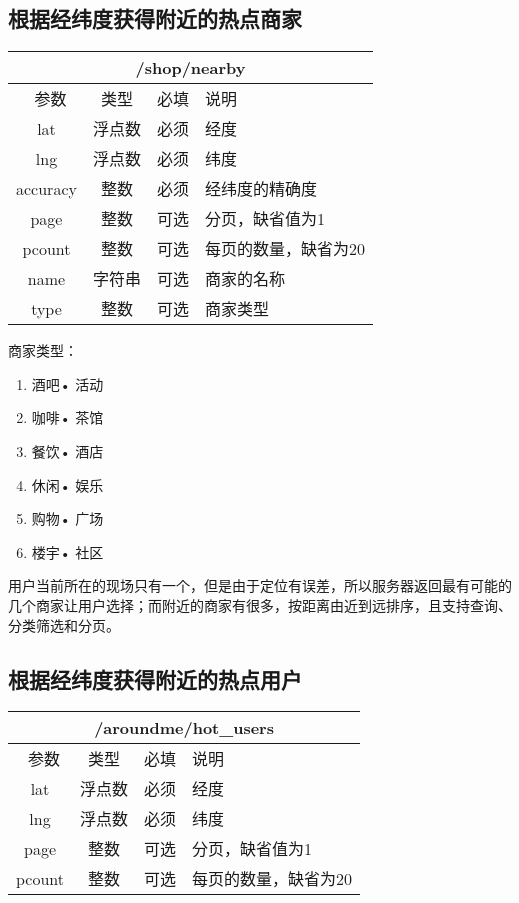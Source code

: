 \documentclass[cs4size]{ctexartutf8}
\begin{document}
\subsection{根据经纬度获得附近的热点商家}

\begin{table}[H]
   \begin{center}
\begin{tabular}{|c|c|c|p{12cm}|}
\hline
\multicolumn{4}{|c|}{/shop/nearby} \\
\hline\hline
 \  参数  & 类型 & 必填 &  说明  \\
\hline
 lat  & 浮点数 & 必须 & 经度\\
\hline
 lng  &  浮点数 & 必须 & 纬度\\ 
\hline
 accuracy  & 整数 & 必须 & 经纬度的精确度\\ 
 \hline
 page  & 整数 & 可选 & 分页，缺省值为1\\ 
 \hline
 pcount  & 整数 & 可选 & 每页的数量，缺省为20\\ 
  \hline
 name  & 字符串 & 可选 & 商家的名称\\ 
  \hline
 type  & 整数 & 可选 & 商家类型\\  
\hline
\end{tabular}
   \end{center}
\end{table}

商家类型：
\begin{enumerate}
\item 酒吧• 活动
\item 咖啡• 茶馆   
\item 餐饮• 酒店
\item 休闲• 娱乐
\item 购物• 广场
\item 楼宇• 社区
\end{enumerate}


用户当前所在的现场只有一个，但是由于定位有误差，所以服务器返回最有可能的几个商家让用户选择；而附近的商家有很多，按距离由近到远排序，且支持查询、分类筛选和分页。


\subsection{根据经纬度获得附近的热点用户}

\begin{table}[H]
   \begin{center}
\begin{tabular}{|c|c|c|p{12cm}|}
\hline
\multicolumn{4}{|c|}{/aroundme/hot\_users} \\
\hline\hline
 \  参数  & 类型 & 必填 &  说明  \\
\hline
 lat  & 浮点数 & 必须 & 经度\\
\hline
 lng  &  浮点数 & 必须 & 纬度\\ 
  \hline
 page  & 整数 & 可选 & 分页，缺省值为1\\ 
 \hline
 pcount  & 整数 & 可选 & 每页的数量，缺省为20\\ 
\hline
\end{tabular}
   \end{center}
\end{table}
\end{document}
